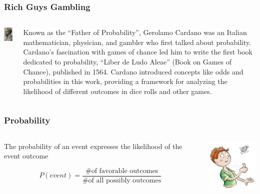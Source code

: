 \documentclass{beamer}
\begin{document}
\begin{frame}\frametitle{Rich Guys Gambling}
\begin{columns}
\begin{column}{4cm}
\begin{center}
\includegraphics[width=3cm]{fig/cardano.jpg}
\end{center}
\end{column}
\begin{column}{7.5cm}
Known as the “Father of Probability”, Gerolamo Cardano was an Italian mathematician, physician, and gambler who first talked about probability. Cardano’s fascination with games of chance led him to write the first book dedicated to probability, “Liber de Ludo Aleae” (Book on Games of Chance), published in 1564. Cardano introduced concepts like odds and probabilities in this work, providing a framework for analyzing the likelihood of different outcomes in dice rolls and other games.
\end{column}
\end{columns}
\end{frame}

\begin{frame}\frametitle{Probability}


\begin{columns}
\begin{column}{5cm}
The probability of an event expresses the likelihood of the event outcome

\[P(event) = \frac{\text{\# of favorable outcomes}}{\text{\# of all possibly outcomes}}\]
\end{column}
\begin{column}{5cm}
\begin{center}
\includegraphics[width=3cm]{fig/coinflip.jpg}
\end{center}
\end{column}
\end{columns}
\end{frame}
\end{document}
